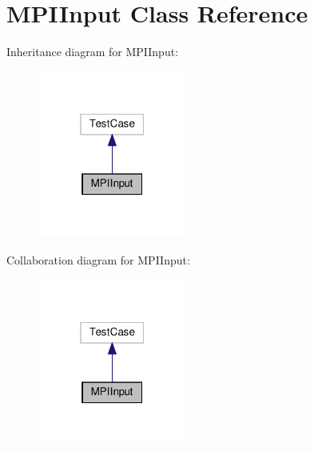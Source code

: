 \hypertarget{classMPIInput}{}\section{M\+P\+I\+Input Class Reference}
\label{classMPIInput}


Inheritance diagram for M\+P\+I\+Input\+:
\nopagebreak
\begin{figure}[H]
\begin{center}
\leavevmode
\includegraphics[width=139pt]{classMPIInput__inherit__graph}
\end{center}
\end{figure}


Collaboration diagram for M\+P\+I\+Input\+:
\nopagebreak
\begin{figure}[H]
\begin{center}
\leavevmode
\includegraphics[width=139pt]{classMPIInput__coll__graph}
\end{center}
\end{figure}
